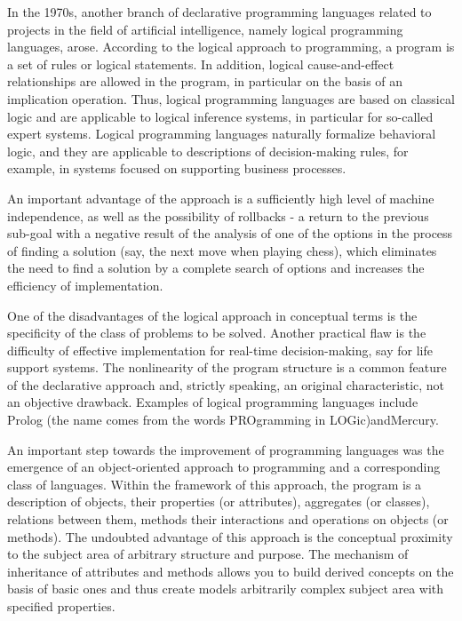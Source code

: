 \documentclass[12pt]{book}
\begin{document}
In the 1970s, another branch of declarative programming languages related to projects in the field of artificial intelligence, namely logical programming languages, arose. According to the logical approach to programming, a program is a set of rules or logical statements. In addition, logical cause-and-effect relationships are allowed in the program, in particular on the basis of an implication operation. Thus, logical programming languages are based on classical logic and are applicable to logical inference systems, in particular for so-called expert systems. Logical programming languages naturally formalize behavioral logic, and they are applicable to descriptions of decision-making rules, for example, in systems focused on supporting business processes.

An important advantage of the approach is a sufficiently high level of machine independence, as well as the possibility of rollbacks - a return to the previous sub-goal with a negative result of the analysis of one of the options in the process of finding a solution (say, the next move when playing chess), which eliminates the need to find a solution by a complete search of options and increases the efficiency of implementation.

One of the disadvantages of the logical approach in conceptual terms is the specificity of the class of problems to be solved. Another practical flaw is the difficulty of effective implementation for real-time decision-making, say for life support systems. The nonlinearity of the program structure is a common feature of the declarative approach and, strictly speaking, an original characteristic, not an objective drawback. Examples of logical programming languages include Prolog  (the name comes from the words  PROgramming  in  LOGic)andMercury.

An important step towards the improvement of programming languages was the emergence of an object-oriented approach to programming and a corresponding class of languages. Within the framework of this approach, the program is a description of objects, their properties (or attributes), aggregates (or classes), relations between them, methods their interactions and operations on objects (or methods). The undoubted advantage of this approach is the conceptual proximity to the subject area of arbitrary structure and purpose. The mechanism of inheritance of attributes and methods allows you to build derived concepts on the basis of basic ones and thus create models arbitrarily complex subject area with specified properties.
\end{document}
